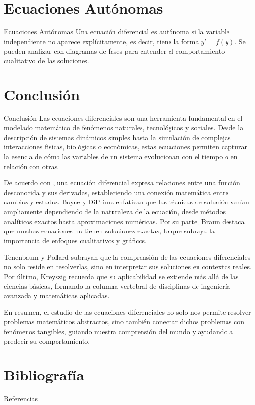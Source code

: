 \documentclass{beamer}
\begin{document}
\section{Ecuaciones Autónomas}
\begin{frame}{Ecuaciones Autónomas}
Una ecuación diferencial es autónoma si la variable independiente no aparece explícitamente, es decir, tiene la forma $y' = f(y)$. Se pueden analizar con diagramas de fases para entender el comportamiento cualitativo de las soluciones.
\end{frame}

\section{Conclusión}
\begin{frame}{Conclusión}
Las ecuaciones diferenciales son una herramienta fundamental en el modelado matemático de fenómenos naturales, tecnológicos y sociales. Desde la descripción de sistemas dinámicos simples hasta la simulación de complejas interacciones físicas, biológicas o económicas, estas ecuaciones permiten capturar la esencia de cómo las variables de un sistema evolucionan con el tiempo o en relación con otras.

De acuerdo con \cite{zill2009ecuaciones}, una ecuación diferencial expresa relaciones entre una función desconocida y sus derivadas, estableciendo una conexión matemática entre cambios y estados. Boyce y DiPrima \cite{boyce2010ecuaciones} enfatizan que las técnicas de solución varían ampliamente dependiendo de la naturaleza de la ecuación, desde métodos analíticos exactos hasta aproximaciones numéricas. Por su parte, Braun \cite{braun1992applications} destaca que muchas ecuaciones no tienen soluciones exactas, lo que subraya la importancia de enfoques cualitativos y gráficos.

Tenenbaum y Pollard \cite{tenenbaum1985ordinary} subrayan que la comprensión de las ecuaciones diferenciales no solo reside en resolverlas, sino en interpretar sus soluciones en contextos reales. Por último, Kreyszig \cite{kreyszig2011advanced} recuerda que su aplicabilidad se extiende más allá de las ciencias básicas, formando la columna vertebral de disciplinas de ingeniería avanzada y matemáticas aplicadas.

En resumen, el estudio de las ecuaciones diferenciales no solo nos permite resolver problemas matemáticos abstractos, sino también conectar dichos problemas con fenómenos tangibles, guiando nuestra comprensión del mundo y ayudando a predecir su comportamiento.
\end{frame}

\section{Bibliografía}
\begin{frame}[allowframebreaks]{Referencias}


\end{frame}
\end{document}

